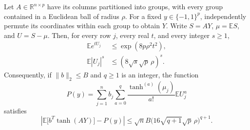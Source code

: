 \begin{lemma}\label{lem:perm-moments}
Let $A\in\mathbb R^{n\times p}$ have its columns partitioned into groups,
with every group contained in a Euclidean ball of radius $\rho$.
For a fixed $y\in\{-1,1\}^p$, independently permute its coordinates
within each group to obtain $Y$. Write $S=AY$, $\mu=\mathbb ES$, and
$U=S-\mu$. Then, for every row $j$, every real $t$, and every integer $s\ge1$,
\begin{align}
 \mathbb E e^{tU_j}&\le \exp(8p\rho^2t^2),\label{eq:perm-mgf}\\
 \mathbb E|U_j|^s&\le(8\sqrt{s}\sqrt p\,\rho)^s.\label{eq:perm-moment}
\end{align}
Consequently, if $\|b\|_2\le B$ and $q\ge1$ is an integer, the function
\[
 P(y)=\sum_{j=1}^n b_j
       \sum_{a=0}^{q}\frac{\tanh^{(a)}(\mu_j)}{a!}
                         \mathbb E U_j^a
\]
satisfies
\begin{equation}\label{eq:perm-taylor}
 \left|\mathbb E\bigl[b^T\tanh(AY)\bigr]-P(y)\right|
 \le \sqrt n B\bigl(16\sqrt{q+1}\sqrt p\,\rho\bigr)^{q+1}.
\end{equation}
\end{lemma}
